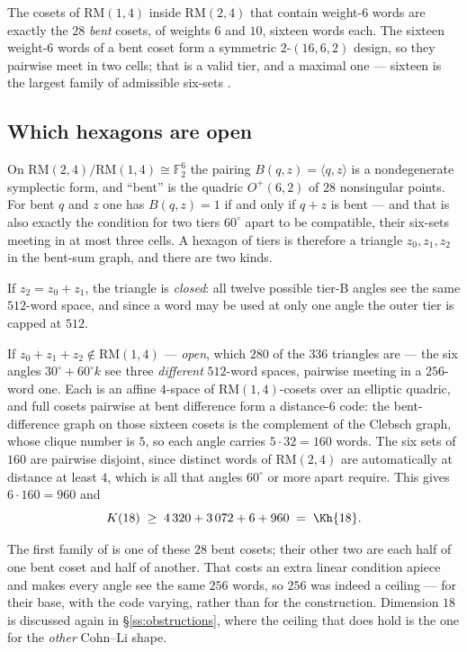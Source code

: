 \documentclass[11pt]{amsart}
\theoremstyle{remark}
\newcommand{\ip}[2]{\langle #1,#2\rangle}
\begin{document}
The cosets of $\mathrm{RM}(1,4)$ inside $\mathrm{RM}(2,4)$ that contain weight-$6$
words are exactly the $28$ \emph{bent} cosets, of weights $6$ and $10$, sixteen
words each. The sixteen weight-$6$ words of a bent coset form a symmetric
$2$-$(16,6,2)$ design, so they pairwise meet in two cells; that is a valid tier,
and a maximal one --- sixteen is the largest family of admissible six-sets
\cite{repo}.

\subsection{Which hexagons are open}

On $\mathrm{RM}(2,4)/\mathrm{RM}(1,4)\cong\mathbb F_2^{6}$ the pairing
$B(q,z)=\ip{q}{z}$ is a nondegenerate symplectic form, and ``bent'' is the
quadric $O^{+}(6,2)$ of $28$ nonsingular points. For bent $q$ and $z$ one has
$B(q,z)=1$ if and only if $q+z$ is bent --- and that is also exactly the condition
for two tiers $60^\circ$ apart to be compatible, their six-sets meeting in at
most three cells. A hexagon of tiers is therefore a triangle $z_0,z_1,z_2$ in the
bent-sum graph, and there are two kinds.

If $z_2=z_0+z_1$, the triangle is \emph{closed}: all twelve possible tier-B
angles see the same $512$-word space, and since a word may be used at only one
angle the outer tier is capped at $512$.

If $z_0+z_1+z_2\notin\mathrm{RM}(1,4)$ --- \emph{open}, which $280$ of the $336$
triangles are --- the six angles $30^\circ+60^\circ k$ see three \emph{different}
$512$-word spaces, pairwise meeting in a $256$-word one. Each is an affine
$4$-space of $\mathrm{RM}(1,4)$-cosets over an elliptic quadric, and full cosets
pairwise at bent difference form a distance-$6$ code: the bent-difference graph on
those sixteen cosets is the complement of the Clebsch graph, whose clique number
is $5$, so each angle carries $5\cdot32=160$ words. The six sets of $160$ are
pairwise disjoint, since distinct words of $\mathrm{RM}(2,4)$ are automatically at
distance at least $4$, which is all that angles $60^\circ$ or more apart require.
This gives $6\cdot160=960$ and
\[
  K(18)\;\ge\;4\,320+3\,072+6+960\;=\;\Kh{18}.
\]

The first family of \cite{cohn-li2024} is one of these $28$ bent cosets; their
other two are each half of one bent coset and half of another. That costs an extra
linear condition apiece and makes every angle see the same $256$ words, so $256$
was indeed a ceiling --- for their base, with the code varying, rather than for the
construction. Dimension $18$ is discussed again in \S\ref{ss:obstructions}, where
the ceiling that does hold is the one for the \emph{other} Cohn--Li shape.
\end{document}
